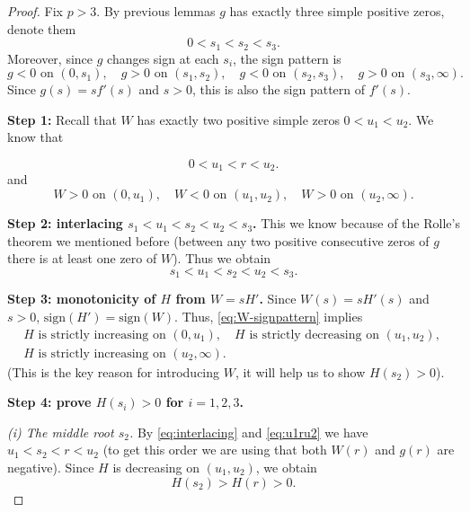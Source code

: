 \documentclass[11pt]{article}
\theoremstyle{definition}
\newcommand{\1}{\mathbf{1}}
\begin{document}
\begin{proof}
Fix $p>3$. By previous lemmas $g$ has exactly three simple positive zeros, denote them
\[
0<s_1<s_2<s_3.
\]
Moreover, since $g$ changes sign at each $s_i$, the sign pattern is
\begin{equation}\label{eq:g-sign-pattern}
g<0 \text{ on }(0,s_1),\quad
g>0 \text{ on }(s_1,s_2),\quad
g<0 \text{ on }(s_2,s_3),\quad
g>0 \text{ on }(s_3,\infty).
\end{equation}
Since $g(s)=sf'(s)$ and $s>0$, this is also the sign pattern of $f'(s)$.

\medskip
\noindent\textbf{Step 1:} Recall that $W$ has exactly two positive simple zeros $0<u_{1}<u_{2}$.  We know that


\begin{equation}\label{eq:u1ru2}
0<u_1<r<u_2.
\end{equation}
 and
\begin{equation}\label{eq:W-signpattern}
W>0\text{ on }(0,u_1),\quad
W<0\text{ on }(u_1,u_2),\quad
W>0\text{ on }(u_2,\infty).
\end{equation}

\medskip
\noindent\textbf{Step 2: interlacing $s_1<u_1<s_2<u_2<s_3$.}
This we know because of the Rolle's theorem we mentioned before (between any two positive consecutive zeros of $g$ there is at least one zero of $W$). Thus we obtain
\begin{equation}\label{eq:interlacing}
s_1<u_1<s_2<u_2<s_3.
\end{equation}

\medskip
\noindent\textbf{Step 3: monotonicity of $H$ from $W=sH'$.}
Since $W(s)=sH'(s)$ and $s>0$, $\mathrm{sign}(H')=\mathrm{sign}(W)$.
Thus, \eqref{eq:W-signpattern} implies
\begin{align*}
&H \text{ is strictly increasing on }(0,u_1),\quad
H \text{ is strictly decreasing on }(u_1,u_2),\quad\\
&H \text{ is strictly increasing on }(u_2,\infty).
\end{align*}
(This is the key reason for introducing $W$, it will help us to show $H(s_{2})>0$). 

\medskip

\noindent\textbf{Step 4: prove $H(s_i)>0$ for $i=1,2,3$.}

\smallskip
\noindent\emph{(i) The middle root $s_2$.}
By \eqref{eq:interlacing} and \eqref{eq:u1ru2} we have $u_1<s_2<r<u_2$ (to get this order we are using that both $W(r)$ and $g(r)$ are negative).
Since $H$ is decreasing on $(u_1,u_2)$, we obtain
$$
H(s_2)>H(r)>0.
$$


\end{proof}
\end{document}
